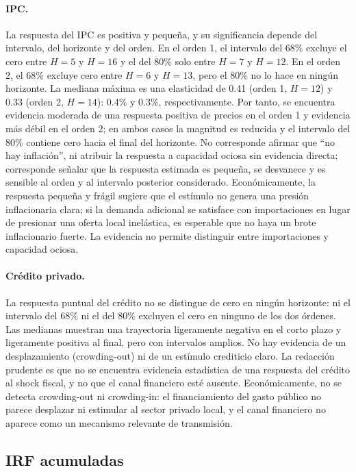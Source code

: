 \documentclass[11pt,a4paper]{article}
\begin{document}
\paragraph{IPC.}
La respuesta del IPC es positiva y pequeña, y su significancia depende del
intervalo, del horizonte y del orden. En el orden 1, el intervalo del 68\%
excluye el cero entre $H{=}5$ y $H{=}16$ y el del 80\% solo entre $H{=}7$ y
$H{=}12$. En el orden 2, el 68\% excluye cero entre $H{=}6$ y $H{=}13$, pero el
80\% no lo hace en ningún horizonte. La mediana máxima es una elasticidad de 0.41 (orden 1, $H{=}12$) y 0.33
(orden 2, $H{=}14$): 0.4\% y 0.3\%, respectivamente. Por tanto, se encuentra evidencia
moderada de una respuesta positiva de precios en el orden 1 y evidencia más
débil en el orden 2; en ambos casos la magnitud es reducida y el intervalo
del 80\% contiene cero hacia el final del horizonte. No corresponde afirmar que
``no hay inflación'', ni atribuir la respuesta a capacidad ociosa sin
evidencia directa; corresponde señalar que la respuesta estimada es
pequeña, se desvanece y es sensible al orden y al intervalo posterior
considerado. Económicamente, la respuesta pequeña y frágil sugiere que el
estímulo no genera una presión inflacionaria clara; si la demanda adicional se
satisface con importaciones en lugar de presionar una oferta local inelástica, es
esperable que no haya un brote inflacionario fuerte. La evidencia no permite
distinguir entre importaciones y capacidad ociosa.

\paragraph{Crédito privado.}
La respuesta puntual del crédito no se distingue de cero en ningún
horizonte: ni el intervalo del 68\% ni el del 80\% excluyen el cero en ninguno de
los dos órdenes. Las medianas muestran una trayectoria ligeramente negativa
en el corto plazo y ligeramente positiva al final, pero con intervalos amplios.
No hay evidencia de un desplazamiento (crowding-out) ni de un estímulo
crediticio claro. La redacción prudente es que no se encuentra evidencia
estadística de una respuesta del crédito al shock fiscal, y no que el
canal financiero esté ausente. Económicamente, no se detecta crowding-out ni
crowding-in: el financiamiento del gasto público no parece desplazar ni estimular
al sector privado local, y el canal financiero no aparece como un mecanismo
relevante de transmisión.

\subsection{IRF acumuladas}
\label{sec:irf_cum}
\end{document}
